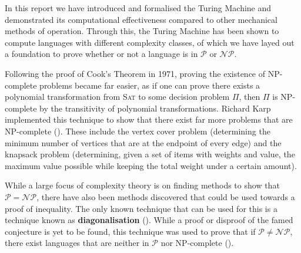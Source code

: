 In this report we have introduced and formalised the Turing Machine and demonstrated its computational effectiveness compared to other mechanical methods of operation. Through this, the Turing Machine has been shown to compute languages with different complexity classes, of which we have layed out a foundation to prove whether or not a language is in $\mathcal{P}$ or $\mathcal{NP}$.

Following the proof of Cook's Theorem in 1971, proving the existence of NP-complete problems became far easier, as if one can prove there exists a polynomial transformation from \textsc{Sat} to some decision problem $\Pi$, then $\Pi$ is NP-complete by the transitivity of polynomial transformations. Richard Karp implemented this technique to show that there exist far more problems that are NP-complete (\cite{Karp1972}). These include the vertex cover problem (determining the minimum number of vertices that are at the endpoint of every edge) and the knapsack problem (determining, given a set of items with weights and value, the maximum value possible while keeping the total weight under a certain amount).

While a large focus of complexity theory is on finding methods to show that $\mathcal{P} = \mathcal{NP}$, there have also been methods discovered that could be used towards a proof of inequality. The only known technique that can be used for this is a technique known as \textbf{diagonalisation} (\cite{AroraSanjeev2009Cc:a}). While a proof or disproof of the famed conjecture is yet to be found, this technique was used to prove that if $\mathcal{P} \neq \mathcal{NP}$, there exist languages that are neither in $\mathcal{P}$ nor NP-complete (\cite{LadnerRichardE.1975OtSo}).